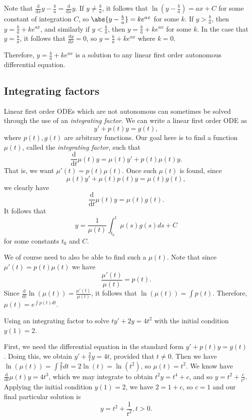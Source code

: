 \documentclass[12pt]{article}
\begin{document}
Note that $\frac{\mathrm{d}}{\mathrm{d}x}{y - \frac{b}{a}} = \frac{\mathrm{d}}{\mathrm{d}x}y$. If $y \neq \frac{b}{a}$, it follows that $\ln(y - \frac{b}{a}) = ax + C$ for some constant of integration $C$, so $\abs{y - \frac{b}{a}} = ke^{ax}$ for some $k$. If $y > \frac{b}{a}$, then $y = \frac{b}{a} + ke^{ax}$, and similarly if $y < \frac{b}{a}$, then $y = \frac{b}{a} + ke^{ax}$ for some $k$. In the case that $y = \frac{b}{a}$, it follows that $\frac{\mathrm{d}y}{\mathrm{d}x} = 0$, so $y = \frac{b}{a} + ke^{ax}$ where $k = 0$.

Therefore, $y = \frac{b}{a} + ke^{ax}$ is a solution to any linear first order autonomous differential equation.

\subsection{Integrating factors}

Linear first order ODEs which are not autonomous can sometimes be solved through the use of an \emph{integrating factor}. We can write a linear first order ODE as \[y' + p(t)y = g(t),\] where $p(t), g(t)$ are arbitrary functions. Our goal here is to find a function $\mu(t)$, called the \emph{integrating factor}, such that
\[\frac{\mathrm{d}}{\mathrm{d}t}\mu(t)y = \mu(t)y' + p(t)\mu(t)y.\] That is, we want $\mu'(t) = p(t)\mu(t)$. Once such $\mu(t)$ is found, since \[\mu(t)y' + \mu(t)p(t)y = \mu(t)g(t),\] we clearly have \[\frac{\mathrm{d}}{\mathrm{d}t}\mu(t)y = \mu(t)g(t).\] It follows that \[y = \frac{1}{\mu(t)}\int_{t_0}^t \mu(s)g(s)ds + C\] for some constants $t_0$ and $C$.

We of course need to also be able to find such a $\mu(t)$. Note that since $\mu'(t) = p(t)\mu(t)$ we have \[\frac{\mu'(t)}{\mu(t)} = p(t).\] Since $\frac{\mathrm{d}}{\mathrm{d}t}\ln(\mu(t)) = \frac{\mu'(t)}{\mu(t)}$, it follows that $\ln(\mu(t)) = \int p(t)$. Therefore, $\mu(t) = e^{\int p(t)dt}$.

\begin{exmp}
    Using an integrating factor to solve $ty' + 2y = 4t^2$ with the initial condition $y(1) = 2$.

    First, we need the differential equation in the standard form $y' + p(t)y = g(t)$. Doing this, we obtain $y' + \frac{2}{t}y = 4t$, provided that $t \neq 0$. Then we have $\ln(\mu(t)) = \int \frac{2}{t}dt = 2\ln(t) = \ln(t^2)$, so $\mu(t) = t^2$. We know have $\frac{\mathrm{d}}{\mathrm{d}t}\mu(t)y = 4t^3$, which we may integrate to obtain $t^2y = t^4 + c$, and so $y = t^2 + \frac{c}{t^2}$. Applying the initial condition $y(1) = 2$, we have $2 = 1 + c$, so $c = 1$ and our final particular solution is \[y = t^2 + \frac{1}{t^2}, t > 0.\]
\end{exmp}
\end{document}
